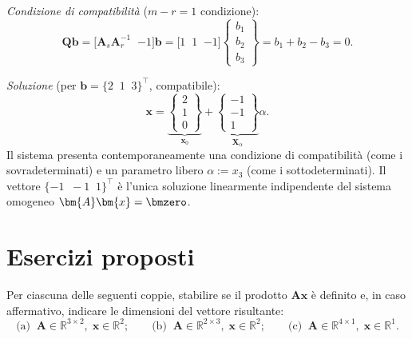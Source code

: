\noindent\textit{Condizione di compatibilit\`a} ($m-r=1$ condizione):
\begin{equation}
	\bm{Q}\bm{b}
	= \bigl[\bm{A}_s\bm{A}_r^{-1}\;\;{-1}\bigr]\bm{b}
	= \bigl[1\;\;1\;\;{-1}\bigr]
	\begin{Bmatrix} b_1 \\ b_2 \\ b_3 \end{Bmatrix}
	= b_1 + b_2 - b_3 = 0.
\end{equation}

\noindent\textit{Soluzione} (per $\bm{b}=\{2\;\;1\;\;3\}^\top$, compatibile):
\begin{equation}
	\bm{x}
	= \underbrace{\begin{Bmatrix} 2 \\ 1 \\ 0 \end{Bmatrix}}_{\bm{x}_0}
	+ \underbrace{\begin{Bmatrix} -1 \\ -1 \\ 1 \end{Bmatrix}}_{\bm{X}_\alpha} \alpha.
\end{equation}
Il sistema presenta contemporaneamente una condizione di compatibilit\`a (come
i sovradeterminati) e un parametro libero $\alpha := x_3$ (come i
sottodeterminati). Il vettore $\{-1\;\;-1\;\;1\}^\top$ \`e l'unica soluzione
linearmente indipendente del sistema omogeneo $\bm{A}\bm{x}=\bmzero$.



\section{Esercizi proposti}


\begin{esercizio} 
	Per ciascuna delle seguenti coppie, stabilire se il prodotto
	$\bm{A}\bm{x}$ \`e definito e, in caso affermativo, indicare le
	dimensioni del vettore risultante:
	\begin{equation*}
		\text{(a)}\;\;
		\bm{A}\in\mathbb{R}^{3\times 2},\;\bm{x}\in\mathbb{R}^{2};
		\qquad
		\text{(b)}\;\;
		\bm{A}\in\mathbb{R}^{2\times 3},\;\bm{x}\in\mathbb{R}^{2};
		\qquad
		\text{(c)}\;\;
		\bm{A}\in\mathbb{R}^{4\times 1},\;\bm{x}\in\mathbb{R}^{1}.
	\end{equation*}
\end{esercizio} 



